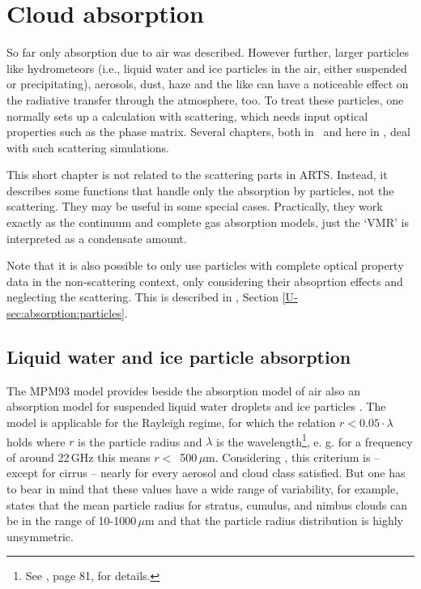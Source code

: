 
\chapter{Cloud absorption}
\label{sec:abs_theory:cloudabsorption}

So far only absorption due to air was described. However 
further, larger particles like hydrometeors (i.e., liquid water and
ice particles in the air, either suspended or precipitating),
aerosols, dust, haze and the like can have a noticeable effect on the radiative
transfer through the atmosphere, too.
To treat these particles, one normally sets up a calculation with
scattering, which needs input optical properties such as the phase
matrix. Several chapters, both in \user\ and here in \theory, deal
with such scattering simulations.

This short chapter is not related to the scattering parts in
ARTS. Instead, it describes some functions that handle only the
absorption by particles, not the scattering. They may be useful in
some special cases. Practically, they work exactly as the continuum
and complete gas absorption models, just the `VMR' is interpreted as a
condensate amount.

Note that it is also possible to only use particles with complete optical
property data in the non-scattering context, only considering their absoprtion
effects and neglecting the scattering. This is described in \user, Section
\ref{U-sec:absorption:particles}.

\section{Liquid water and ice particle absorption}
\label{sec:abs_theory:lipartabs}

The MPM93 model provides beside the absorption model of air also an
absorption model for suspended liquid water droplets and ice particles
\citep{liebe:89b,liebeetal:91,hufford:91,liebeetal:93}.  The model is
applicable for the Rayleigh regime, for which the relation $r <
0.05\cdot \lambda$ holds where $r$ is the particle radius and
$\lambda$ is the wavelength\footnote{See \citet{brussaard:95}, page
  81, for details.}, e. g. for a frequency of around 22\,GHz 
this means $r<$~500\,$\mu$m. Considering \citet{salby:96}, this criterium is --
except for cirrus -- nearly for every aerosol and cloud class
satisfied. But one has to bear in mind that these values have a wide
range of variability, for example, \citet{salby:96} states that the
mean particle radius for stratus, cumulus, and nimbus clouds can be in
the range of 10-1000\,$\mu$m and that the particle radius distribution
is highly unsymmetric. 

